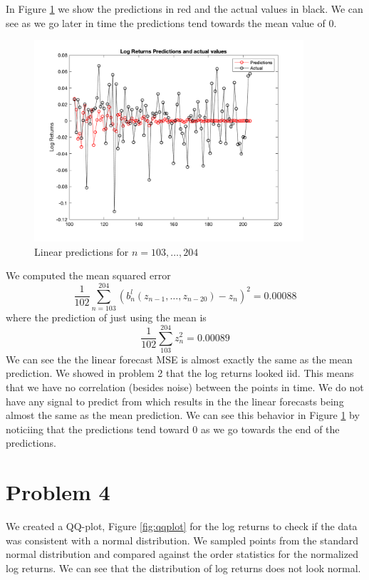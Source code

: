 \documentclass{article}
\begin{document}
In Figure \ref{fig:log_preds} we show the predictions in red and the actual values in black.
We can see as we go later in time the predictions tend towards the mean value of 0.

\begin{figure}[H]
\includegraphics[width=10cm]{plots/log_returns_preds.png}
\centering
\caption{Linear predictions for $n = 103,\ldots, 204$}
\label{fig:log_preds}
\end{figure}

We computed the mean squared error
$$
\frac{1}{102} \sum_{n = 103}^{204} (b_n^l(z_{n-1}, \ldots, z_{n - 20}) - z_n)^2 = 0.00088
$$
where the prediction of just using the mean is
$$
\frac{1}{102} \sum_{103}^{204} z_n^2 = 0.00089
$$
We can see the the linear forecast MSE is almost exactly the same as the mean prediction.
We showed in problem 2 that the log returns looked iid.
This means that we have no correlation (besides noise) between the points in time.
We do not have any signal to predict from which results in the the linear forecasts being almost the same as the mean prediction.
We can see this behavior in Figure \ref{fig:log_preds} by noticiing that the predictions tend toward 0 as we go towards the end of the predictions.

\section*{Problem 4}
We created a QQ-plot, Figure \ref{fig:qqplot} for the log returns to check if the data was consistent with a normal distribution.
We sampled points from the standard normal distribution and compared against the order statistics for the normalized log returns.
We can see that the distribution of log returns does not look normal.
\end{document}
